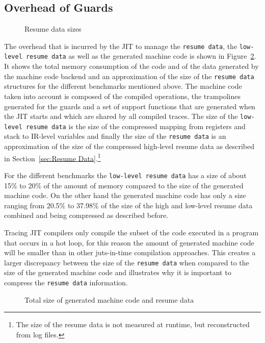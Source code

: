 \documentclass[10pt,preprint]{sigplanconf}
\begin{document}
\subsection{Overhead of Guards}
\label{sub:guard_overhead}
\begin{figure}
    
    \caption{Resume data sizes}
    \label{fig:resume_data_sizes}
\end{figure}

The overhead that is incurred by the JIT to manage the \texttt{resume data},
the \texttt{low-level resume data} as well as the generated machine code is
shown in Figure~\ref{fig:backend_data}. It shows the total memory consumption
of the code and of the data generated by the machine code backend and an
approximation of the size of the \texttt{resume data} structures for the
different benchmarks mentioned above. The machine code taken into account is
composed of the compiled operations, the trampolines generated for the guards
and a set of support functions that are generated when the JIT starts and which
are shared by all compiled traces. The size of the \texttt{low-level resume
data} is the size of the compressed mapping from registers and stack to
IR-level variables and finally the size of the \texttt{resume data} is an
approximation of the size of the compressed high-level resume data as described
in Section~\ref{sec:Resume Data}.\footnote{
The size of the resume data is not measured at runtime, but reconstructed from
log files.}

For the different benchmarks the \texttt{low-level resume data} has a size of
about 15\% to 20\% of the amount of memory compared to the size of the
generated machine code. On the other hand the generated machine code has only a
size ranging from 20.5\% to 37.98\% of the size of the high and low-level
resume data combined and being compressed as described before.

Tracing JIT compilers only compile the subset of the code executed in a program
that occurs in a hot loop, for this reason the amount of generated machine
code will be smaller than in other juts-in-time compilation approaches.  This
creates a larger discrepancy between the size of the \texttt{resume data} when
compared to the size of the generated machine code and illustrates why it is important to compress the \texttt{resume data} information.

\begin{figure}
    
    \caption{Total size of generated machine code and resume data}
    \label{fig:backend_data}
\end{figure}
\end{document}
